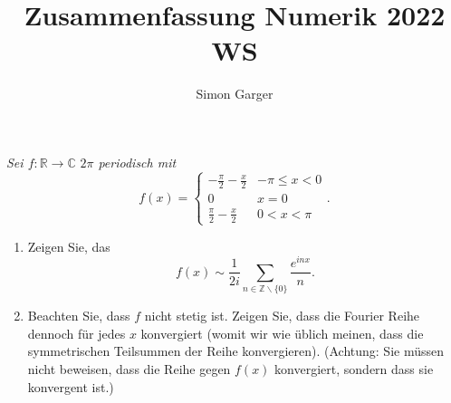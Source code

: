 \documentclass[11pt]{article}
\title{Zusammenfassung Numerik 2022 WS}
\author{Simon Garger}
\newenvironment{problem}[2][Beispiel]{
    \begin{trivlist}
        \item[\hskip \labelsep {\bfseries #1}\hskip \labelsep {\bfseries #2.}] \itshape}{
    \end{trivlist}\normalshape
}
\begin{document}
    \begin{problem}{1}
        Sei $f: \mathbb{R} \rightarrow \mathbb{C} \,\,2 \pi$ periodisch mit
        $$
        f(x)=\left\{\begin{array}{ll}
                        -\frac{\pi}{2}-\frac{x}{2} & -\pi \leq x<0 \\
                        0 & x=0 \\
                        \frac{\pi}{2}-\frac{x}{2} & 0<x<\pi
        \end{array} .\right.
        $$
        \begin{enumerate}[label = (\alph*)]
            \item Zeigen Sie, das
            $$
            f(x) \sim \frac{1}{2 i} \sum_{n \in \mathbb{Z} \backslash\{0\}} \frac{e^{i n x}}{n} .
            $$
            \item Beachten Sie, dass $f$ nicht stetig ist. Zeigen Sie, dass die Fourier Reihe dennoch für jedes
            $x$ konvergiert (womit wir wie üblich meinen, dass die symmetrischen Teilsummen der Reihe
            konvergieren).
            (Achtung: Sie müssen nicht beweisen, dass die Reihe gegen $f(x)$ konvergiert, sondern dass sie
            konvergent ist.)
        \end{enumerate}
    \end{problem}
\end{document}
